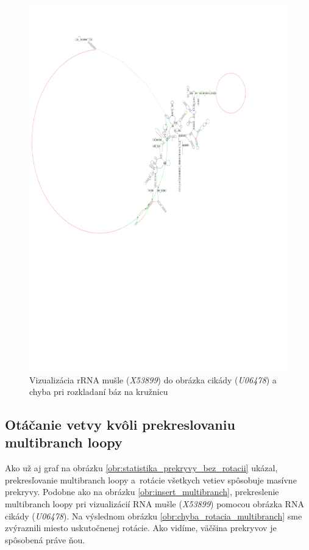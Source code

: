 \begin{figure}
  \includegraphics[clip, trim=0 10cm 3cm 2cm,width=1\textwidth]{../img/chyby/african_frog-echinococcus_granulosus}
  \caption{Vizualizácia rRNA mušle (\textit{X53899}) do obrázka cikády (\textit{U06478}) a chyba pri rozkladaní báz na kružnicu}
  \label{obr:chyba_rozloženie_loopy}
\end{figure}

\subsection{Otáčanie vetvy kvôli prekreslovaniu multibranch \mbox{loopy}}

Ako už aj graf na obrázku \ref{obr:statistika_prekryvy_bez_rotacii} ukázal,
prekresľovanie multibranch loopy a~rotácie všetkych vetiev spôsobuje masívne prekryvy.
Podobne ako na obrázku \ref{obr:insert_multibranch}, prekreslenie multibranch loopy
pri vizualizácií RNA mušle (\textit{X53899}) pomocou obrázka RNA cikády (\textit{U06478}).
Na výslednom obrázku \ref{obr:chyba_rotacia_multibranch} sme zvýraznili miesto
uskutočnenej rotácie. Ako vidíme, väčšina prekryvov je spôsobená práve ňou.

